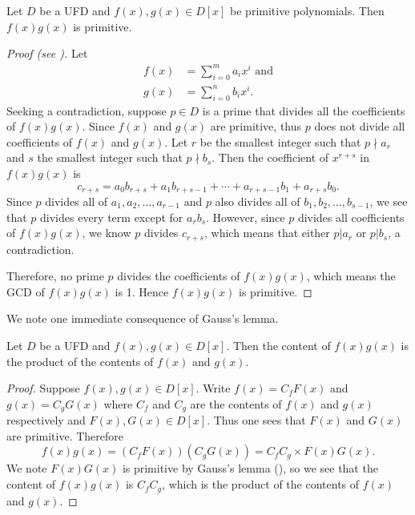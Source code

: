 \begin{lemma}[Gauss]\label{lemma-gauss}
    Let $D$ be a UFD and $f(x), g(x) \in D[x]$ be primitive polynomials. Then $f(x)g(x)$ is primitive.
\end{lemma}
\begin{proof}[Proof (see {\cite[Theorem 18.24]{judson_beezer_2022}})]
    Let
    \begin{align*}
        f(x) &= \sum_{i=0}^m a_ix^i \text{ and}\\
        g(x) &= \sum_{i=0}^n b_ix^i.
    \end{align*}
    Seeking a contradiction, suppose $p \in D$ is a prime that divides all the coefficients of $f(x)g(x)$. Since $f(x)$ and $g(x)$ are primitive, thus $p$ does not divide all coefficients of $f(x)$ and $g(x)$. Let $r$ be the smallest integer such that $p \nmid a_r$ and $s$ the smallest integer such that $p \nmid b_s$. Then the coefficient of $x^{r+s}$ in $f(x)g(x)$ is
    \[
        c_{r+s} = a_0b_{r+s} + a_1b_{r+s-1} + \cdots + a_{r+s-1}b_1 + a_{r+s}b_0.
    \]
    Since $p$ divides all of $a_1, a_2, \dots, a_{r-1}$ and $p$ also divides all of $b_1, b_2, \dots, b_{s-1}$, we see that $p$ divides every term except for $a_rb_s$. However, since $p$ divides all coefficients of $f(x)g(x)$, we know $p$ divides $c_{r+s}$, which means that either $p \vert a_r$ or $p \vert b_s$, a contradiction.

    Therefore, no prime $p$ divides the coefficients of $f(x)g(x)$, which means the GCD of $f(x)g(x)$ is 1. Hence $f(x)g(x)$ is primitive.
\end{proof}

We note one immediate consequence of Gauss's lemma.

\begin{corollary}\label{corollary-content-of-product-is-product-of-content-for-polynomials}
    Let $D$ be a UFD and $f(x), g(x) \in D[x]$. Then the content of $f(x)g(x)$ is the product of the contents of $f(x)$ and $g(x)$.
\end{corollary}
\begin{proof}
    Suppose $f(x), g(x) \in D[x]$. Write $f(x) = C_f F(x)$ and $g(x) = C_g G(x)$ where $C_f$ and $C_g$ are the contents of $f(x)$ and $g(x)$ respectively and $F(x), G(x) \in D[x]$. Thus one sees that $F(x)$ and $G(x)$ are primitive. Therefore
    \[
        f(x)g(x) = (C_f F(x))(C_g G(x)) = C_fC_g \times F(x)G(x).
    \]
    We note $F(x)G(x)$ is primitive by Gauss's lemma (), so we see that the content of $f(x)g(x)$ is $C_fC_g$, which is the product of the contents of $f(x)$ and $g(x)$.
\end{proof}

